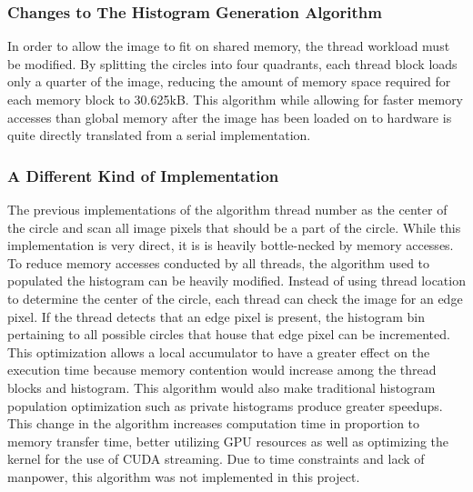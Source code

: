 \documentclass[12pt]{article}
\begin{document}
\subsubsection*{Changes to The Histogram Generation Algorithm}
In order to allow the image to fit on shared memory, the thread workload must be modified.
By splitting the circles into four quadrants, each thread block loads only a quarter of the image, reducing the amount of memory space required for each memory block to 30.625kB. 
This algorithm while allowing for faster memory accesses than global memory after the image has been loaded on to hardware is quite directly translated from a serial implementation.

\subsubsection*{A Different Kind of Implementation}
The previous implementations of the algorithm thread number as the center of the circle and scan all image pixels that should be a part of the circle.
While this implementation is very direct, it is is heavily bottle-necked by memory accesses. 
To reduce memory accesses conducted by all threads, the algorithm used to populated the histogram can be heavily modified.
Instead of using thread location to determine the center of the circle, each thread can check the image for an edge pixel. 
If the thread detects that an edge pixel is present, the histogram bin pertaining to all possible circles that house that edge pixel can be incremented.
This optimization allows a local accumulator to have a greater effect on the execution time because memory contention would increase among the thread blocks and histogram. 
This algorithm would also make traditional histogram population optimization such as private histograms produce greater speedups.
This change in the algorithm increases computation time in proportion to memory transfer time, better utilizing GPU resources as well as optimizing the kernel for the use of CUDA streaming.
Due to time constraints and lack of manpower, this algorithm was not implemented in this project.
\end{document}
